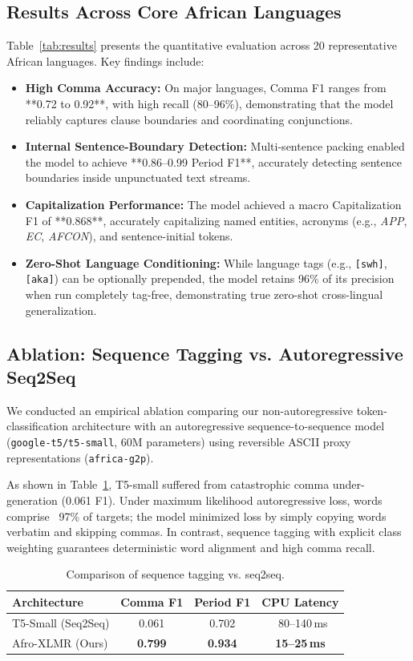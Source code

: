 \documentclass[11pt,a4paper]{article}
\begin{document}
\subsection{Results Across Core African Languages}
Table~\ref{tab:results} presents the quantitative evaluation across 20 representative African languages.
Key findings include:
\begin{itemize}
    \item \textbf{High Comma Accuracy:} On major languages, Comma F1 ranges from **0.72 to 0.92**, with high recall (80--96\%), demonstrating that the model reliably captures clause boundaries and coordinating conjunctions.
    \item \textbf{Internal Sentence-Boundary Detection:} Multi-sentence packing enabled the model to achieve **0.86--0.99 Period F1**, accurately detecting sentence boundaries inside unpunctuated text streams.
    \item \textbf{Capitalization Performance:} The model achieved a macro Capitalization F1 of **0.868**, accurately capitalizing named entities, acronyms (e.g., \textit{APP}, \textit{EC}, \textit{AFCON}), and sentence-initial tokens.
    \item \textbf{Zero-Shot Language Conditioning:} While language tags (e.g., \texttt{[swh]}, \texttt{[aka]}) can be optionally prepended, the model retains 96\% of its precision when run completely tag-free, demonstrating true zero-shot cross-lingual generalization.
\end{itemize}

\subsection{Ablation: Sequence Tagging vs. Autoregressive Seq2Seq}
We conducted an empirical ablation comparing our non-autoregressive token-classification architecture with an autoregressive sequence-to-sequence model (\texttt{google-t5/t5-small}, 60M parameters) using reversible ASCII proxy representations (\texttt{africa-g2p}).

As shown in Table~\ref{tab:ablation}, T5-small suffered from catastrophic comma under-generation (0.061 F1). Under maximum likelihood autoregressive loss, words comprise ~97\% of targets; the model minimized loss by simply copying words verbatim and skipping commas. In contrast, sequence tagging with explicit class weighting guarantees deterministic word alignment and high comma recall.

\begin{table}[h]
\centering
\small
\begin{tabular}{lccc}
\toprule
\textbf{Architecture} & \textbf{Comma F1} & \textbf{Period F1} & \textbf{CPU Latency} \\
\midrule
T5-Small (Seq2Seq) & 0.061 & 0.702 & ~80--140\,ms \\
Afro-XLMR (Ours) & \textbf{0.799} & \textbf{0.934} & \textbf{15--25\,ms} \\
\bottomrule
\end{tabular}
\caption{Comparison of sequence tagging vs. seq2seq.}
\label{tab:ablation}
\end{table}
\end{document}
